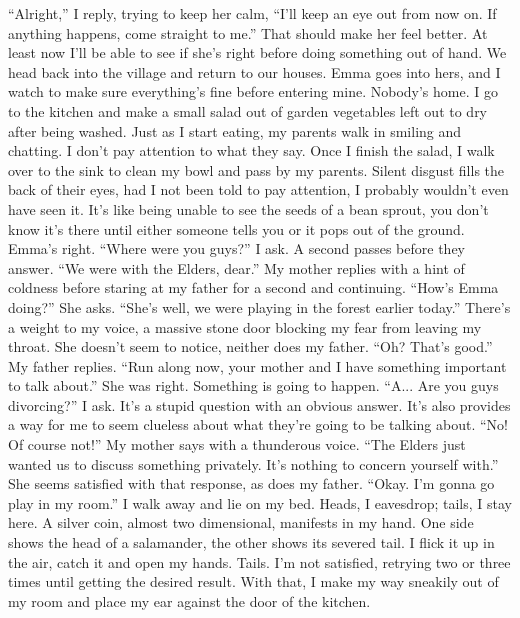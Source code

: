\documentclass[openany, 12pt]{book}
\newcommand\tab[1][1cm]{\hspace*{#1}}
\begin{document}
\newline
\tab
``Alright,'' I reply, trying to keep her calm, ``I’ll keep an eye out from now on. If anything happens, come straight to me.''  That should make her feel better. At least now I’ll be able to see if she’s right before doing something out of hand.
\newline
\tab
We head back into the village and return to our houses. Emma goes into hers, and I watch to make sure everything’s fine before entering mine.  Nobody’s home. I go to the kitchen and make a small salad out of garden vegetables left out to dry after being washed. Just as I start eating, my parents walk in smiling and chatting. I don’t pay attention to what they say. Once I finish the salad, I walk over to the sink to clean my bowl and pass by my parents. Silent disgust fills the back of their eyes, had I not been told to pay attention, I probably wouldn’t even have seen it. It’s like being unable to see the seeds of a bean sprout, you don’t know it’s there until either someone tells you or it pops out of the ground. Emma’s right. ``Where were you guys?'' I ask. A second passes before they answer.
\newline
\tab
``We were with the Elders, dear.'' My mother replies with a hint of coldness before staring at my father for a second and continuing. ``How’s Emma doing?'' She asks.
\newline
\tab
``She’s well, we were playing in the forest earlier today.'' There’s a weight to my voice, a massive stone door blocking my fear from leaving my throat. She doesn’t seem to notice, neither does my father.
\newline
\tab
``Oh? That’s good.'' My father replies. ``Run along now, your mother and I have something important to talk about.'' She was right. Something is going to happen. 
\newline
\tab
``A... Are you guys divorcing?'' I ask. It’s a stupid question with an obvious answer. It’s also provides a way for me to seem clueless about what they’re going to be talking about.
\newline
\tab
``No! Of course not!'' My mother says with a thunderous voice. ``The Elders just wanted us to discuss something privately. It’s nothing to concern yourself with.'' She seems satisfied with that response, as does my father. 
\newline
\tab
``Okay. I’m gonna go play in my room.'' I walk away and lie on my bed. Heads, I eavesdrop; tails, I stay here. A silver coin, almost two dimensional, manifests in my hand. One side shows the head of a salamander, the other shows its severed tail. I flick it up in the air, catch it and open my hands. Tails. I’m not satisfied, retrying two or three times until getting the desired result. With that, I make my way sneakily out of my room and place my ear against the door of the kitchen.
\end{document}
